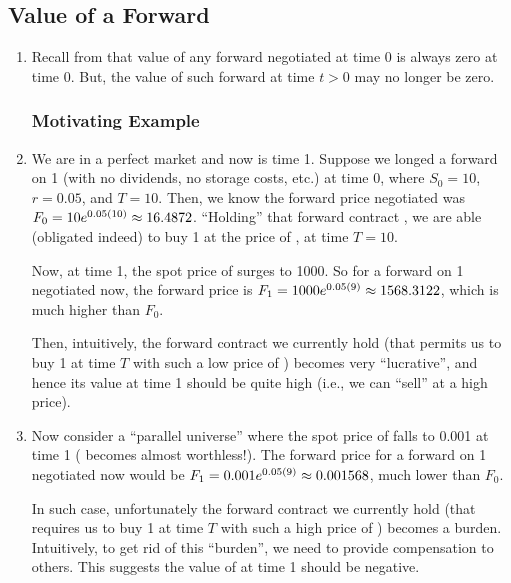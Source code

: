 \subsection{Value of a Forward}
\label{subsect:value-fwd}
\begin{enumerate}
\item Recall from  that value of any forward
negotiated at time 0 is always zero at time 0. But, the value of such forward at
time \(t>0\) may no longer be zero.

\subsubsection*{Motivating Example}
\item We are in a perfect market and now is time 1.
Suppose we longed a forward on 1  (with no dividends, no
storage costs, etc.) at time 0, where \(S_0=10\), \(r=0.05\), and \(T=10\).
Then, we know the forward price negotiated was \(F_0=10e^{0.05(10)}\approx
\fpeval{round(10*exp(0.05*10),4)}\).  ``Holding'' that forward contract
, we are able (obligated indeed) to buy 1  at the
price of , at time \(T=10\).

Now, at time 1, the spot price of  surges 
to 1000. So for a forward on 1  negotiated now, the forward
price is \(F_1=1000e^{0.05(9)}\approx \fpeval{round(1000*exp(0.05*9),4)}\),
which is much higher than \(F_0\).

Then, intuitively, the forward contract
 we currently hold (that permits us to buy 1 
at time \(T\) with such a low price of )
becomes very ``lucrative'', and hence its value at time 1 should be quite high
(i.e., we can ``sell''  at a high price).

\item Now consider a ``parallel universe'' where the spot price of
 falls  to 0.001 at time 1
( becomes almost worthless!). The forward price for a forward
on 1  negotiated now would be \(F_1=0.001e^{0.05(9)}\approx
\fpeval{round(0.001*exp(0.05*9),6)}\), much lower than \(F_0\).

In such case, unfortunately the forward contract  we currently
hold (that requires us to buy 1  at time \(T\) with such a
high price of ) becomes a burden.
Intuitively, to get rid of this ``burden'', we need to provide compensation to
others.  This suggests the value of  at time 1 should be
negative.


\end{enumerate}
